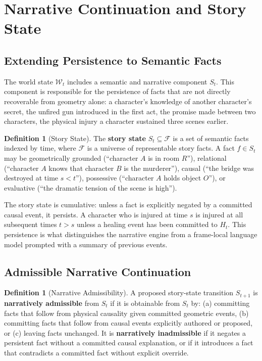 \documentclass[12pt,a4paper]{article}
\theoremstyle{plain}
\theoremstyle{definition}
\newtheorem{definition}[theorem]{Definition}
\theoremstyle{remark}
\begin{document}
\section{Narrative Continuation and Story State}
\label{sec:narrative}

\subsection{Extending Persistence to Semantic Facts}

The world state $\mathcal{W}_t$ includes a semantic and narrative component $S_t$. This component is responsible for the persistence of facts that are not directly recoverable from geometry alone: a character's knowledge of another character's secret, the unfired gun introduced in the first act, the promise made between two characters, the physical injury a character sustained three scenes earlier.

\begin{definition}[Story State]
The \textbf{story state} $S_t \subseteq \mathcal{F}$ is a set of semantic facts indexed by time, where $\mathcal{F}$ is a universe of representable story facts. A fact $f \in S_t$ may be geometrically grounded (``character $A$ is in room $R$''), relational (``character $A$ knows that character $B$ is the murderer''), causal (``the bridge was destroyed at time $s < t$''), possessive (``character $A$ holds object $O$''), or evaluative (``the dramatic tension of the scene is high'').
\end{definition}

The story state is cumulative: unless a fact is explicitly negated by a committed causal event, it persists. A character who is injured at time $s$ is injured at all subsequent times $t > s$ unless a healing event has been committed to $H_t$. This persistence is what distinguishes the narrative engine from a frame-local language model prompted with a summary of previous events.

\subsection{Admissible Narrative Continuation}

\begin{definition}[Narrative Admissibility]
A proposed story-state transition $S_{t+1}$ is \textbf{narratively admissible} from $S_t$ if it is obtainable from $S_t$ by: (a) committing facts that follow from physical causality given committed geometric events, (b) committing facts that follow from causal events explicitly authored or proposed, or (c) leaving facts unchanged. It is \textbf{narratively inadmissible} if it negates a persistent fact without a committed causal explanation, or if it introduces a fact that contradicts a committed fact without explicit override.
\end{definition}
\end{document}
